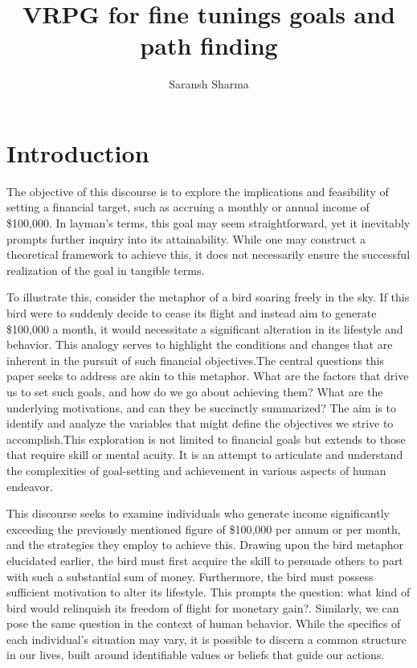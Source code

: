\documentclass{article}
\title{VRPG for fine tunings goals and path finding}
\author{Saransh Sharma}
\begin{document}
	\maketitle
	
	\section{Introduction}
	The objective of this discourse is to explore the implications and feasibility of setting a financial target, such as accruing a monthly or annual income of \$100,000. In layman's terms, this goal may seem straightforward, yet it inevitably prompts further inquiry into its attainability. While one may construct a theoretical framework to achieve this, it does not necessarily ensure the successful realization of the goal in tangible terms. 

To illustrate this, consider the metaphor of a bird soaring freely in the sky. If this bird were to suddenly decide to cease its flight and instead aim to generate \$100,000 a month, it would necessitate a significant alteration in its lifestyle and behavior. This analogy serves to highlight the conditions and changes that are inherent in the pursuit of such financial objectives.The central questions this paper seeks to address are akin to this metaphor. What are the factors that drive us to set such goals, and how do we go about achieving them? What are the underlying motivations, and can they be succinctly summarized? The aim is to identify and analyze the variables that might define the objectives we strive to accomplish.This exploration is not limited to financial goals but extends to those that require skill or mental acuity. It is an attempt to articulate and understand the complexities of goal-setting and achievement in various aspects of human endeavor.

This discourse seeks to examine individuals who generate income significantly exceeding the previously mentioned figure of \$100,000 per annum or per month, and the strategies they employ to achieve this. Drawing upon the bird metaphor elucidated earlier, the bird must first acquire the skill to persuade others to part with such a substantial sum of money. Furthermore, the bird must possess sufficient motivation to alter its lifestyle. This prompts the question: what kind of bird would relinquish its freedom of flight for monetary gain?. Similarly, we can pose the same question in the context of human behavior. While the specifics of each individual's situation may vary, it is possible to discern a common structure in our lives, built around identifiable values or beliefs that guide our actions. 
\end{document}
